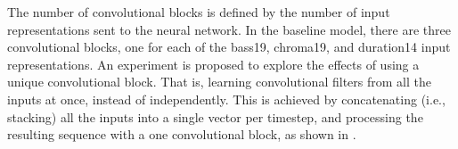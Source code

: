 
The number of convolutional blocks is defined by the number
of input representations sent to the neural network. In the
baseline model, there are three convolutional blocks, one
for each of the \gls{bass19}, \gls{chroma19}, and
\gls{duration14} input representations. An experiment is
proposed to explore the effects of using a unique
convolutional block. That is, learning convolutional filters
from all the inputs at once, instead of independently. This
is achieved by concatenating (i.e., stacking) all the inputs
into a single vector per timestep, and processing the
resulting sequence with a one convolutional block, as shown
in .

